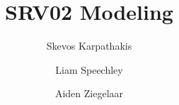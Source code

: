 \documentclass{article}
\begin{document}
\title{SRV02 Modeling}
\author{
Skevos Karpathakis \and
Liam Speechley \and
Aiden Ziegelaar
}
\maketitle
\newpage
\tableofcontents







\end{document}
